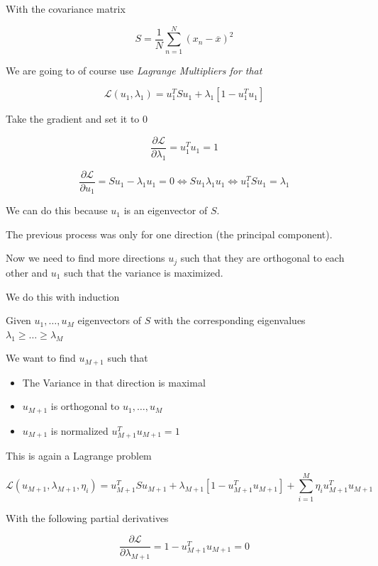 With the covariance matrix 

\[
    S = \frac{1}{N} \sum_{n = 1}^{N}  (x_n - \overline{x})^2 
\]

We are going to of course use \emph{Lagrange Multipliers for that}

\[
    \mathcal{L}(u_1, \lambda_1) = u_1^T S u_1 + \lambda_1[1 - u_1^T u_1 ]
\]

Take the gradient and set it to 0 

\[
    \frac{\partial \mathcal{L}}{\partial \lambda_1} = u_1^T u_1 = 1 
\]

\[
    \frac{\partial \mathcal{L}}{\partial u_1} =  Su_1 - \lambda_1 u_1 = 0 \iff S u_1 \lambda_1 u_1  \iff u_1^T S u_1 = \lambda_1
\]

We can do this because \(u_1\) is an eigenvector of \(S\).

The previous process was only for one direction (the principal component). 

Now we need to find more directions \(u_j\) such that they are orthogonal to each other and \(u_1\) such 
that the variance is maximized.

We do this with induction 

Given \(u_1, \dots, u_M\) eigenvectors of \(S\) with the corresponding eigenvalues 
\(\lambda_1 \ge \dots \ge \lambda_M\)

We want to find \(u_{M + 1}\) such that 

\begin{itemize}

    \item The Variance in that direction is maximal 

    \item \(u_{M + 1}\) is orthogonal to \(u_1, \dots, u_M\)

    \item \(u_{M + 1}\) is normalized \(u_{M + 1}^T u_{M + 1} = 1\)

\end{itemize}

This is again a Lagrange problem 

\[
    \mathcal{L}(u_{M + 1}, \lambda_{M + 1}, \eta_i) = u_{M + 1}^T S u_{M + 1} + \lambda_{M + 1} [1 - u_{M + 1}^T u_{M + 1}] + \sum_{i = 1}^{M} \eta_i u_{M + 1}^T u_{M + 1}
\]

With the following partial derivatives 

\[
    \frac{\partial \mathcal{L}}{\partial \lambda_{M + 1}} = 1 - u_{M + 1}^T  u_{M + 1} = 0
\]

